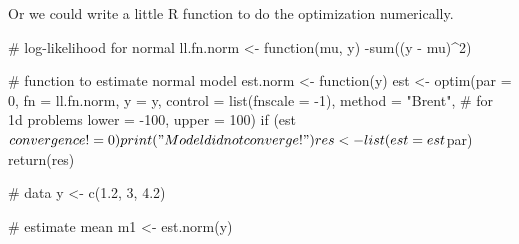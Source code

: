 \documentclass[handout]{beamer}
\begin{document}


\begin{frame}[fragile]
Or we could write a little R function to do the optimization numerically.
\begin{scriptsize}
\pause \begin{blockcode} 
# log-likelihood for normal
ll.fn.norm <- function(mu, y) {
  -sum((y - mu)^2)
}
\end{blockcode}

\pause \begin{blockcode}
# function to estimate normal model
est.norm <- function(y) {
  est <- optim(par = 0, fn = ll.fn.norm, y = y,
               control = list(fnscale = -1),
               method = "Brent",  # for 1d problems
               lower = -100, upper = 100)
  if (est$convergence != 0) print("Model did not converge!")
  res <- list(est = est$par)
  return(res)
}
\end{blockcode}

\pause \begin{blockcode}
# data
y <- c(1.2, 3, 4.2)
\end{blockcode}

\pause \begin{blockcode}
# estimate mean
m1 <- est.norm(y)
\end{blockcode}
\end{scriptsize}
\end{frame}
\end{document}
